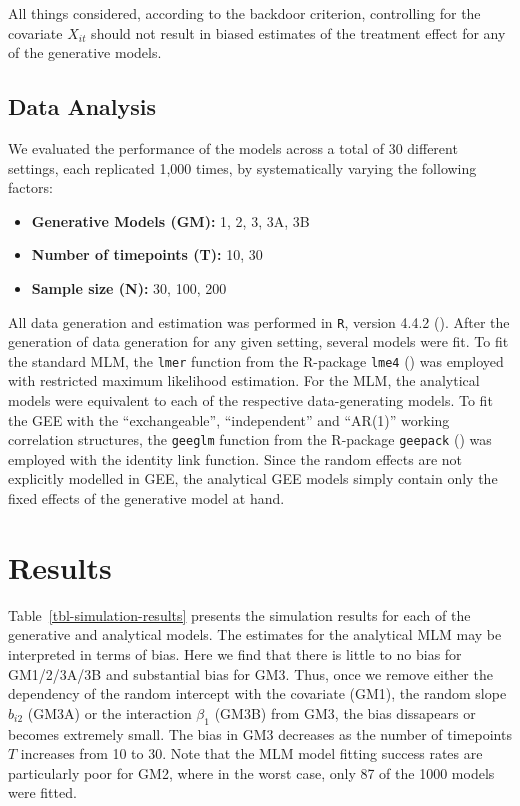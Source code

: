 \documentclass[
  12pt,
  a4paper,
]{article}
\begin{document}
All things considered, according to the backdoor criterion, controlling
for the covariate \(X_{it}\) should not result in biased estimates of
the treatment effect for any of the generative models.

\subsection{Data Analysis}\label{data-analysis}

We evaluated the performance of the models across a total of 30
different settings, each replicated 1,000 times, by systematically
varying the following factors:

\begin{itemize}
\item
  \textbf{Generative Models (GM):} 1, 2, 3, 3A, 3B
\item
  \textbf{Number of timepoints (T):} 10, 30
\item
  \textbf{Sample size (N):} 30, 100, 200
\end{itemize}

All data generation and estimation was performed in \texttt{R}, version
4.4.2 (). After the generation
of data generation for any given setting, several models were fit. To
fit the standard MLM, the \texttt{lmer} function from the R-package
\texttt{lme4} () was
employed with restricted maximum likelihood estimation. For the MLM, the
analytical models were equivalent to each of the respective
data-generating models. To fit the GEE with the ``exchangeable'',
``independent'' and ``AR(1)'' working correlation structures, the
\texttt{geeglm} function from the R-package \texttt{geepack}
() was employed with the
identity link function. Since the random effects are not explicitly
modelled in GEE, the analytical GEE models simply contain only the fixed
effects of the generative model at hand.

\section{Results}\label{results}

Table~\ref{tbl-simulation-results} presents the simulation results for
each of the generative and analytical models. The estimates for the
analytical MLM may be interpreted in terms of bias. Here we find that
there is little to no bias for GM1/2/3A/3B and substantial bias for GM3.
Thus, once we remove either the dependency of the random intercept with
the covariate (GM1), the random slope \(b_{i2}\) (GM3A) or the
interaction \(\beta_1\) (GM3B) from GM3, the bias dissapears or becomes
extremely small. The bias in GM3 decreases as the number of timepoints
\(T\) increases from 10 to 30. Note that the MLM model fitting success
rates are particularly poor for GM2, where in the worst case, only 87 of
the 1000 models were fitted.
\end{document}
